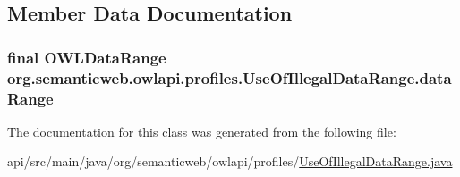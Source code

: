 \subsection{Member Data Documentation}
\hypertarget{classorg_1_1semanticweb_1_1owlapi_1_1profiles_1_1_use_of_illegal_data_range_a2bfd0fdd931efd86e9620b80ef08c7cb}{
\subsubsection[{data\-Range}]{\setlength{\rightskip}{0pt plus 5cm}final {\bf O\-W\-L\-Data\-Range} org.\-semanticweb.\-owlapi.\-profiles.\-Use\-Of\-Illegal\-Data\-Range.\-data\-Range\hspace{0.3cm}{\ttfamily [private]}}}\label{classorg_1_1semanticweb_1_1owlapi_1_1profiles_1_1_use_of_illegal_data_range_a2bfd0fdd931efd86e9620b80ef08c7cb}


The documentation for this class was generated from the following file\-:\begin{DoxyCompactItemize}
\item 
api/src/main/java/org/semanticweb/owlapi/profiles/\hyperlink{_use_of_illegal_data_range_8java}{Use\-Of\-Illegal\-Data\-Range.\-java}\end{DoxyCompactItemize}
